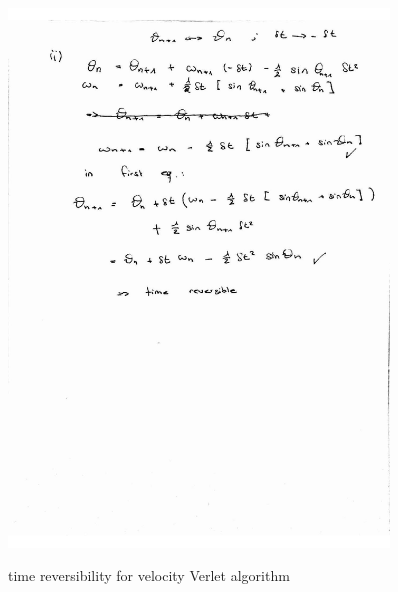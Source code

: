 \documentclass[12pt,a4paper]{article}	%
\begin{document}
\newpage

\begin{figure}[h!]		
\centering
{\includegraphics[width=0.9\textwidth]{3_2_a2.jpg}}		
\caption{time reversibility for velocity Verlet algorithm}
\end{figure}

\newpage


\end{document}
